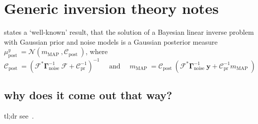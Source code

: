 \documentclass{article}
\newcommand{\dist}[1]{\mathcal{#1}}
\begin{document}
\section{Generic inversion theory notes}
\cite{AlexanderianOptimal2021} states a ‘well-known’ result, that the solution of a Bayesian linear inverse problem with Gaussian prior and noise models is a Gaussian posterior measure \(\mu_{\text {post }}^{y}=\dist{N}\left(m_{\text {MAP }}, \mathcal{C}_{\text {post }}\right)\), where
\[
\mathcal{C}_{\text {post }}=\left(\mathcal{F}^{*} \boldsymbol{\Gamma}_{\text {noise }}^{-1} \mathcal{F}+\mathcal{C}_{\text {pr }}^{-1}\right)^{-1} \quad \text { and } \quad m_{\text {MAP }}=\mathcal{C}_{\text {post }}\left(\mathcal{F}^{*} \boldsymbol{\Gamma}_{\text {noise }}^{-1} \boldsymbol{y}+\mathcal{C}_{\text {pr }}^{-1} m_{\text {MAP }}\right)
\]

\subsection{why does it come out that way?}
tl;dr see~\cite{ArrasIntroduction1998}.
\end{document}
